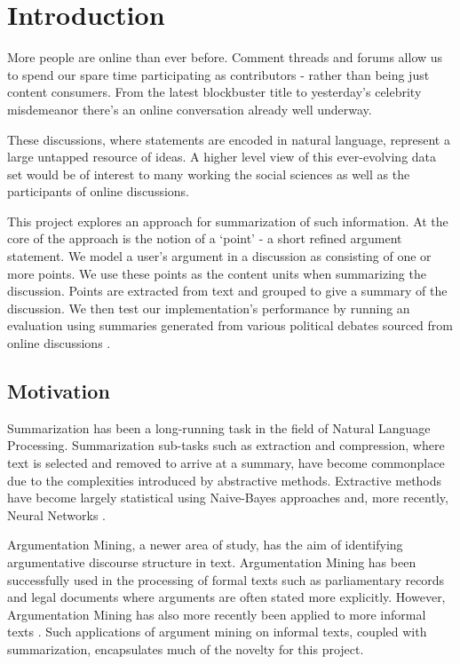 \chapter{Introduction\label{chap:introduction}}
  More people are online than ever before. Comment threads and forums allow us to spend our spare time participating as contributors - rather than being just content consumers. From the latest blockbuster title to yesterday's celebrity misdemeanor there's an online conversation already well underway.

  These discussions, where statements are encoded in natural language, represent a large untapped resource of ideas. A higher level view of this ever-evolving data set would be of interest to many working the social sciences as well as the participants of online discussions.

  This project explores an approach for summarization of such information. At the core of the approach is the notion of a `point' - a short refined argument statement. We model a user's argument in a discussion as consisting of one or more points. We use these points as the content units when summarizing the discussion. Points are extracted from text and grouped to give a summary of the discussion. We then test our implementation's performance by running an evaluation using summaries generated from various political debates sourced from online discussions \cite{walker2012corpus}.

  \section{Motivation}
    Summarization has been a long-running task in the field of Natural Language Processing. Summarization sub-tasks such as extraction and compression, where text is selected and removed to arrive at a summary, have become commonplace due to the complexities introduced by abstractive methods. Extractive methods have become largely statistical using Naive-Bayes \cite{kupiec1995trainable} approaches and, more recently, Neural Networks \cite{svore2007enhancing}.

    Argumentation Mining, a newer area of study, has the aim of identifying argumentative discourse structure in text. Argumentation Mining has been successfully used in the processing of formal texts such as parliamentary records \cite{palau2009argumentation} and legal documents \cite{montemagni2010semantic} where arguments are often stated more explicitly. However, Argumentation Mining has also more recently been applied to more informal texts \cite{park2015conditional}. Such applications of argument mining on informal texts, coupled with summarization, encapsulates much of the novelty for this project.


